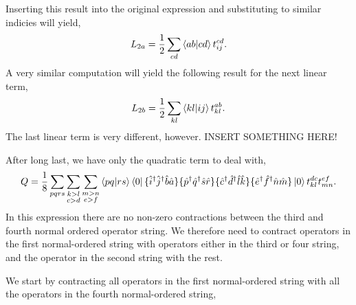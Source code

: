 Inserting this result into the original expression and substituting to similar indicies
will yield,
\begin{equation}
    L_{2a} = \frac{1}{2} \sum_{cd}\bra{ab} \ket{cd} t^{cd}_{ij}.
\end{equation}
A very similar computation will yield the following result for the next linear term,
\begin{equation}
    L_{2b} = \frac{1}{2} \sum_{kl} \bra{kl} \ket{ij} t^{ab}_{kl}.
\end{equation}
The last linear term is very different, however. INSERT SOMETHING HERE!

After long last, we have only the quadratic term to deal with,
\begin{equation}
    Q = \frac{1}{8}\sum_{pqrs}\sum_{\substack{k>l \\ c>d}} \sum_{\substack{m>n \\ e>f}}
        \bra{pq} \ket{rs} \bra{0}
            \{\hat{i}^\dagger \hat{j}^\dagger \hat{b} \hat{a} \}
            \{\hat{p}^\dagger \hat{q}^\dagger \hat{s} \hat{r} \}
            \{\hat{c}^\dagger \hat{d}^\dagger \hat{l} \hat{k} \}
            \{\hat{e}^\dagger \hat{f}^\dagger \hat{n} \hat{m} \}
        \ket{0} t^{dc}_{kl} t^{ef}_{mn}.
\end{equation}
In this expression there are no non-zero contractions between the third and 
fourth normal ordered operator string. We therefore need to contract operators 
in the first normal-ordered string with operators either in the third or four 
string, and the operator in the second string with the rest. 

We start by contracting all operators in the first normal-ordered string 
with all the operators in the fourth normal-ordered string,

